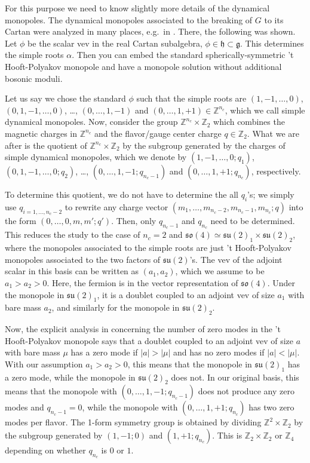 \documentclass[12pt]{article}
\numberwithin{equation}{section}
\def\bZ{\mathbb{Z}}
\def\su{\mathfrak{su}}
\def\so{\mathfrak{so}}
\begin{document}
For this purpose we need to know slightly more details of the dynamical monopoles.
The dynamical monopoles associated to the breaking of $G$ to its Cartan were analyzed in many places, 
e.g.~in \cite{Weinberg:1979zt}.
There, the following was shown.
Let $\phi$ be the scalar vev in the real Cartan subalgebra, $\phi\in \mathfrak{h}\subset \mathfrak{g}$.
This determines the simple roots $\alpha$.
Then you can embed the standard spherically-symmetric 't Hooft-Polyakov monopole and have a monopole solution without additional bosonic moduli. 

Let us say we chose the standard $\phi$ such that the simple roots are $(1,-1,\ldots,0)$,
$(0,1,-1,\ldots,0)$, \ldots, $(0,\ldots,1,-1)$ and $(0,\ldots,1,+1)\in \bZ^{n_c}$,
which we call simple dynamical monopoles.
Now, consider the group $\bZ^{n_c}\times \bZ_2$ which combines the magnetic charges in $\bZ^{n_c}$ and the flavor/gauge center charge $q \in \bZ_2$.
What we are after is the quotient of $\bZ^{n_c}\times \bZ_2$ 
by the subgroup generated by the charges of simple dynamical monopoles,
which we denote by
$(1,-1,\ldots, 0; q_1)$, $(0,1,-1,\ldots, 0; q_2)$, \ldots,
$(0,\ldots, 1,-1; q_{n_c-1})$ and $(0,\ldots,1,+1; q_{n_c})$, respectively.

To determine this quotient,
we do not have to determine the all $q_i$'s; 
we simply use $q_{i=1,\ldots, n_c-2}$ to rewrite any charge vector $
(m_1,\ldots, m_{n_c-2}, m_{n_c-1},m_{n_c}; q)
$
into the form $
(0,\ldots,0, m, m' ; q').
$
Then, only $q_{n_c-1}$ and $q_{n_c}$ need to be determined.
This reduces the study to the case of $n_c=2$ and $\so(4)\simeq \su(2)_1 \times \su(2)_2$,
where the monopoles associated to the simple roots are just 't Hooft-Polyakov monopoles associated to the two factors of $\su(2)$'s.
The vev of the adjoint scalar in this basis can be written as $(a_1,a_2)$, which we assume to be $a_1>a_2>0$.
Here, the fermion is in the vector representation of $\so(4)$.
Under the monopole in $\su(2)_1$, it is a doublet coupled to an adjoint vev of size $a_1$ with bare mass $a_2$,
and similarly for the monopole in $\su(2)_2$.

Now, the explicit analysis in \cite[Sec.~IV]{Callias:1977kg} concerning the number of zero modes in the 't Hooft-Polyakov monopole says that 
a doublet coupled to an adjoint vev of size $a$ with bare mass $\mu$ has
a zero mode if $|a|>|\mu|$ and 
has no zero modes if $|a|<|\mu|$.
With our assumption $a_1>a_2>0$, this means that the monopole in $\su(2)_1$ has a zero mode, while the monopole in $\su(2)_2$ does not.
In our original basis, this means that the monopole with $(0,\ldots,1,-1;q_{n_c-1})$ does not produce any zero modes and $q_{n_c-1}=0$,
while the monopole with $(0,\ldots,1,+1;q_{n_c})$  has two zero modes per flavor.
The 1-form symmetry group is obtained by dividing $\bZ^2\times \bZ_2$ by the subgroup generated by $(1,-1;0)$ and $(1,+1;q_{n_c})$.
This is $\bZ_2\times \bZ_2$ or $\bZ_4$ depending on whether $q_{n_c}$ is $0$ or $1$.
\end{document}
